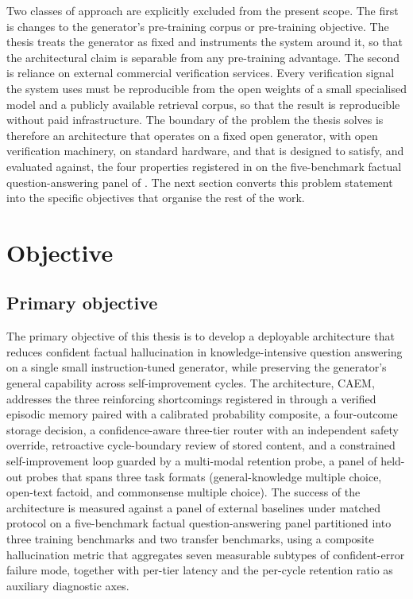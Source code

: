 Two classes of approach are explicitly excluded from the present scope. The first is changes to the generator's pre-training corpus or pre-training objective. The thesis treats the generator as fixed and instruments the system around it, so that the architectural claim is separable from any pre-training advantage. The second is reliance on external commercial verification services. Every verification signal the system uses must be reproducible from the open weights of a small specialised model and a publicly available retrieval corpus, so that the result is reproducible without paid infrastructure. The boundary of the problem the thesis solves is therefore an architecture that operates on a fixed open generator, with open verification machinery, on standard hardware, and that is designed to satisfy, and evaluated against, the four properties registered in  on the five-benchmark factual question-answering panel of . The next section converts this problem statement into the specific objectives that organise the rest of the work.

\section{Objective}
\label{sec:objective}

\subsection{Primary objective}
\label{sec:primary-objective}

The primary objective of this thesis is to develop a deployable architecture that reduces confident factual hallucination in knowledge-intensive question answering on a single small instruction-tuned generator, while preserving the generator's general capability across self-improvement cycles. The architecture, CAEM, addresses the three reinforcing shortcomings registered in  through a verified episodic memory paired with a calibrated probability composite, a four-outcome storage decision, a confidence-aware three-tier router with an independent safety override, retroactive cycle-boundary review of stored content, and a constrained self-improvement loop guarded by a multi-modal retention probe, a panel of held-out probes that spans three task formats (general-knowledge multiple choice, open-text factoid, and commonsense multiple choice). The success of the architecture is measured against a panel of external baselines under matched protocol on a five-benchmark factual question-answering panel partitioned into three training benchmarks and two transfer benchmarks, using a composite hallucination metric that aggregates seven measurable subtypes of confident-error failure mode, together with per-tier latency and the per-cycle retention ratio as auxiliary diagnostic axes.

